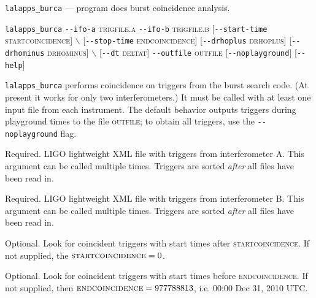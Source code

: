 \begin{entry}
\item[Name]
\verb$lalapps_burca$ --- program does burst coincidence analysis.

\item[Synopsis]
\verb$lalapps_burca$ 
\verb$--ifo-a$ \textsc{trigfile.a} \verb$--ifo-b$ \textsc{trigfile.b} 
[\verb$--start-time$ \textsc{startcoincidence}]
$\backslash$ \newline \hspace*{0.25in}
[\verb$--stop-time$ \textsc{endcoincidence}] 
[\verb$--drhoplus$ \textsc{drhoplus}] [\verb$--drhominus$ \textsc{drhominus}] 
$\backslash$ \newline \hspace*{0.25in}
[\verb$--dt$ \textsc{deltat}] 
\verb$--outfile$ \textsc{outfile} [\verb$--noplayground$] 
[\verb$--help$]

\item[Description] 
\verb$lalapps_burca$ performs coincidence on triggers from the burst
search code.  (At present it works for only two interferometers.) It
must be called with at least one input file from each instrument. The
default behavior outputs triggers during playground times to the file
\textsc{outfile};  to obtain all triggers,  use the
\verb$--noplayground$ flag.     

\item[Options]\leavevmode
\begin{entry}
\item[\texttt{--ifo-a} \textsc{trigfile.a}] Required.  LIGO lightweight
XML file with triggers from interferometer A.  This argument can be
called multiple times.  Triggers are sorted \emph{after} all files
have been read in. 

\item[\texttt{--ifo-b} \textsc{trigfile.b}] Required.  LIGO lightweight
XML file with triggers from interferometer B.  This argument can be
called multiple times.  Triggers are sorted \emph{after} all files
have been read in. 

\item[\texttt{--start-time} \textsc{startcoincidence}] Optional.  Look for
coincident triggers with start times after \textsc{startcoincidence}.
If not supplied,  the $\textsc{startcoincidence} = 0$.

\item[\texttt{--stop-time} \textsc{endcoincidence}]  Optional. Look for
coincident triggers with start times before \textsc{endcoincidence}.
If not supplied,  then $\textsc{endcoincidence} = 977788813$, i.e.
00:00 Dec 31, 2010 UTC.


\end{entry}
\end{entry}
